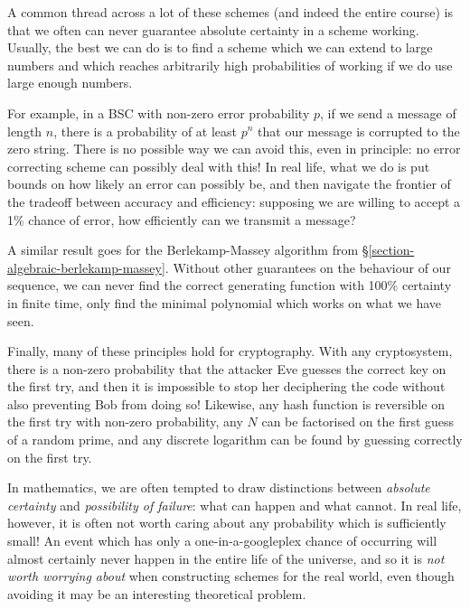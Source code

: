 \documentclass{article}
\begin{document}
\begin{remark}
    A common thread across a lot of these schemes (and indeed the entire course) is that we often can never guarantee absolute certainty in a scheme working. Usually, the best we can do is to find a scheme which we can extend to large numbers and which reaches arbitrarily high probabilities of working if we do use large enough numbers.
    
    For example, in a BSC with non-zero error probability $p$, if we send a message of length $n$, there is a probability of at least $p^n$ that our message is corrupted to the zero string. There is no possible way we can avoid this, even in principle: no error correcting scheme can possibly deal with this! In real life, what we do is put bounds on how likely an error can possibly be, and then navigate the frontier of the tradeoff between accuracy and efficiency: supposing we are willing to accept a 1\% chance of error, how efficiently can we transmit a message?
    
    A similar result goes for the Berlekamp-Massey algorithm from \S\ref{section-algebraic-berlekamp-massey}. Without other guarantees on the behaviour of our sequence, we can never find the correct generating function with 100\% certainty in finite time, only find the minimal polynomial which works on what we have seen.
    
    Finally, many of these principles hold for cryptography. With any cryptosystem, there is a non-zero probability that the attacker Eve guesses the correct key on the first try, and then it is impossible to stop her deciphering the code without also preventing Bob from doing so! Likewise, any hash function is reversible on the first try with non-zero probability, any $N$ can be factorised on the first guess of a random prime, and any discrete logarithm can be found by guessing correctly on the first try.
    
    In mathematics, we are often tempted to draw distinctions between \textit{absolute certainty} and \textit{possibility of failure}: what can happen and what cannot. In real life, however, it is often not worth caring about any probability which is sufficiently small! An event which has only a one-in-a-googleplex chance of occurring will almost certainly never happen in the entire life of the universe, and so it is \textit{not worth worrying about} when constructing schemes for the real world, even though avoiding it may be an interesting theoretical problem.
\end{remark}
\end{document}
